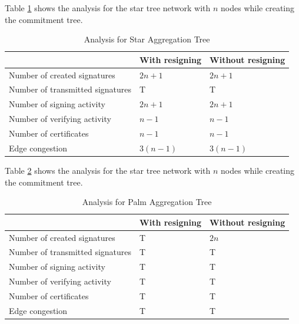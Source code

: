 		Table \ref{table:Analysis table for Star Aggregation Tree} shows the analysis for the star tree network with $n$ nodes while creating the commitment tree.
		\begin{table}[!htb]	
			\begin{center}
				\begin{tabular}{ |l| l| l| }
			    \hline
			    & With resigning & Without resigning \\
			    \hline
			    Number of created signatures & $2n + 1$ & $2n + 1$ \\	
			    \hline
			    Number of transmitted signatures & T & T\\
			    \hline
			    Number of signing activity & $2n + 1$ & $2n + 1$ \\
			    \hline
			    Number of verifying activity & $n - 1$ & $n - 1$ \\
			    \hline
			    Number of certificates & $n - 1$ & $n - 1$ \\
			    \hline
			    Edge congestion & $3(n - 1)$ & $3(n - 1)$\\
			    \hline
				\end{tabular}
			\end{center}
	  	\caption{Analysis for Star Aggregation Tree}
		  \label{table:Analysis table for Star Aggregation Tree}
	  \end{table}

	  Table \ref{table:Analysis table for Palm Aggregation Tree} shows the analysis for the star tree network with $n$ nodes while creating the commitment tree.
		\begin{table}[!htb]	
			\begin{center}
				\begin{tabular}{ |l| l| l| }
			    \hline
			    & With resigning & Without resigning \\
			    \hline
			    Number of created signatures & T & $2n$ \\	
			    \hline
			    Number of transmitted signatures & T & T\\
			    \hline
			    Number of signing activity & T & T \\
			    \hline
			    Number of verifying activity & T & T \\
			    \hline
			    Number of certificates & T & T \\
			    \hline
			    Edge congestion & T & T\\
			    \hline
				\end{tabular}
			\end{center}
	  	\caption{Analysis for Palm Aggregation Tree}
		  \label{table:Analysis table for Palm Aggregation Tree}
	  \end{table} 
		
